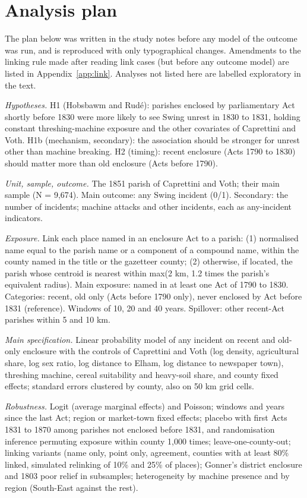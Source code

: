 \documentclass[11pt,a4paper]{article}
\begin{document}
\appendix
\section{Analysis plan}\label{app:plan}
The plan below was written in the study notes before any model of the outcome was run, and is reproduced with only typographical changes. Amendments to the linking rule made after reading link cases (but before any outcome model) are listed in Appendix~\ref{app:link}. Analyses not listed here are labelled exploratory in the text.

\begin{small}
\textit{Hypotheses.} H1 (Hobsbawm and Rud\'e): parishes enclosed by parliamentary Act shortly before 1830 were more likely to see Swing unrest in 1830 to 1831, holding constant threshing-machine exposure and the other covariates of Caprettini and Voth. H1b (mechanism, secondary): the association should be stronger for unrest other than machine breaking. H2 (timing): recent enclosure (Acts 1790 to 1830) should matter more than old enclosure (Acts before 1790).

\textit{Unit, sample, outcome.} The 1851 parish of Caprettini and Voth; their main sample (N = 9,674). Main outcome: any Swing incident (0/1). Secondary: the number of incidents; machine attacks and other incidents, each as any-incident indicators.

\textit{Exposure.} Link each place named in an enclosure Act to a parish: (1) normalised name equal to the parish name or a component of a compound name, within the county named in the title or the gazetteer county; (2) otherwise, if located, the parish whose centroid is nearest within max(2 km, 1.2 times the parish's equivalent radius). Main exposure: named in at least one Act of 1790 to 1830. Categories: recent, old only (Acts before 1790 only), never enclosed by Act before 1831 (reference). Windows of 10, 20 and 40 years. Spillover: other recent-Act parishes within 5 and 10 km.

\textit{Main specification.} Linear probability model of any incident on recent and old-only enclosure with the controls of Caprettini and Voth (log density, agricultural share, log sex ratio, log distance to Elham, log distance to newspaper town), threshing machine, cereal suitability and heavy-soil share, and county fixed effects; standard errors clustered by county, also on 50 km grid cells.

\textit{Robustness.} Logit (average marginal effects) and Poisson; windows and years since the last Act; region or market-town fixed effects; placebo with first Acts 1831 to 1870 among parishes not enclosed before 1831, and randomisation inference permuting exposure within county 1,000 times; leave-one-county-out; linking variants (name only, point only, agreement, counties with at least 80\% linked, simulated relinking of 10\% and 25\% of places); Gonner's district enclosure and 1803 poor relief in subsamples; heterogeneity by machine presence and by region (South-East against the rest).


\end{small}
\end{document}
